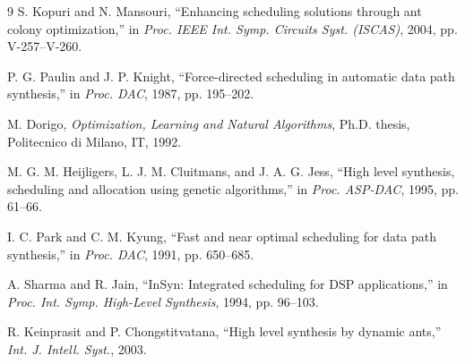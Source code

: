\documentclass[conference]{IEEEtran}
\begin{document}

\begin{thebibliography}{9}
S. Kopuri and N. Mansouri,
``Enhancing scheduling solutions through ant colony optimization,''
in \textit{Proc. IEEE Int. Symp. Circuits Syst. (ISCAS)},
2004, pp. V-257--V-260.

P. G. Paulin and J. P. Knight,
``Force-directed scheduling in automatic data path synthesis,''
in \textit{Proc. DAC}, 1987, pp. 195--202.

M. Dorigo,
\textit{Optimization, Learning and Natural Algorithms},
Ph.D. thesis, Politecnico di Milano, IT, 1992.

M. G. M. Heijligers, L. J. M. Cluitmans, and J. A. G. Jess,
``High level synthesis, scheduling and allocation using genetic
algorithms,''
in \textit{Proc. ASP-DAC}, 1995, pp. 61--66.

I. C. Park and C. M. Kyung,
``Fast and near optimal scheduling for data path synthesis,''
in \textit{Proc. DAC}, 1991, pp. 650--685.

A. Sharma and R. Jain,
``InSyn: Integrated scheduling for DSP applications,''
in \textit{Proc. Int. Symp. High-Level Synthesis}, 1994, pp. 96--103.

R. Keinprasit and P. Chongstitvatana,
``High level synthesis by dynamic ants,''
\textit{Int. J. Intell. Syst.}, 2003.
\end{thebibliography}
\end{document}
